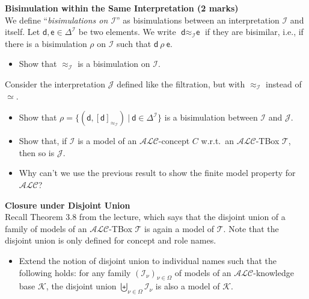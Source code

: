 \documentclass[12pt,a4paper]{article}
\newenvironment{problem}[2][{\color{red}Question}]{\begin{trivlist}
\item[\hskip \labelsep {\bfseries #1}\hskip \labelsep {\bfseries #2.}]}{\end{trivlist}}
\begin{document}
\begin{problem}{{\color{red}3}}
\textbf{Bisimulation within the Same Interpretation (2 marks)}\\
We define ``\emph{bisimulations on $\mathcal{I}$}'' as bisimulations between an interpretation $\mathcal{I}$ and itself. Let $\textsf{d},\textsf{e}\in\Delta^{\mathcal{I}}$ be two elements. We write $\textsf{d}\approx_{\mathcal{I}}\textsf{e}$ if they are bisimilar, i.e., if there is a bisimulation $\rho$ on $\mathcal{I}$ such that $\textsf{d}~\rho~\textsf{e}$.
\begin{itemize}
    \item Show that $\approx_{\mathcal{I}}$ is a bisimulation on $\mathcal{I}$.
\end{itemize}
Consider the interpretation $\mathcal{J}$ defined like the filtration, but with $\approx_{\mathcal{I}}$ instead of $\simeq$.
\begin{itemize}
    \item Show that $\rho=\{(\textsf{d}, [\textsf{d}]_{\approx_{\mathcal{I}}})~|~\textsf{d}\in\Delta^{\mathcal{I}}\}$ is a bisimulation between $\mathcal{I}$ and $\mathcal{J}$.
    \item Show that, if $\mathcal{I}$ is a model of an $\mathcal{ALC}$-concept $C$ w.r.t.\ an $\mathcal{ALC}$-TBox $\mathcal{T}$, then so is $\mathcal{J}$.
    \item Why can't we use the previous result to show the finite model property for $\mathcal{ALC}$?
\end{itemize}
\end{problem}


\begin{problem}{{\color{red}4}}
\textbf{Closure under Disjoint Union}\\
Recall Theorem 3.8 from the lecture, which says that the disjoint union of a family of models of an $\mathcal{ALC}$-TBox $\mathcal{T}$ is again a model of $\mathcal{T}$. Note that the disjoint union is only defined for concept and role names.
\begin{itemize}
    \item Extend the notion of disjoint union to individual names such that the following holds: for any family $(\mathcal{I}_{\nu})_{\nu\in\Omega}$ of models of an $\mathcal{ALC}$-knowledge base $\mathcal{K}$, the disjoint union $\biguplus_{\nu\in\Omega}\mathcal{I}_{\nu}$ is also a model of $\mathcal{K}$.
\end{itemize}
\end{problem}
\end{document}
